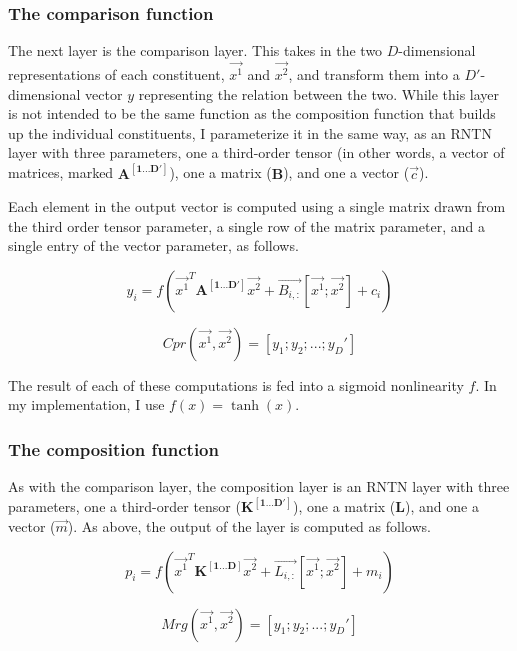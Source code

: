 \documentclass[10pt,letterpaper]{article}
\begin{document}
\subsubsection{The comparison function}

The next layer is the comparison layer. This takes in the two $D$-dimensional representations of each constituent, $\vec{x^1}$ and $\vec{x^2}$, and transform them into a $D'$-dimensional vector $y$ representing the relation between the two. While this layer is not intended to be the same function as the composition function that builds up the individual constituents, I parameterize it in the same way, as an RNTN layer with three parameters, one a third-order tensor (in other words, a vector of matrices, marked $\mathbf{A^{[1...D']}}$), one a matrix  ($\mathbf{B}$), and one a vector ($\vec{c}$).


Each element in the output vector is computed using a single matrix drawn from the third order tensor parameter, a single row of the matrix parameter, and a single entry of the vector parameter, as follows.

\begin{equation}
y_i = f(\vec{x^1}^T \mathbf{A^{[1...D']}} \vec{x^2} + \vec{B_{i,:}} [\vec{x^1}; \vec{x^2}] + c_i)
\end{equation}

\begin{equation}
Cpr(\vec{x^1}, \vec{x^2}) = [y_1; y_2; ...; y_D']
\end{equation}

The result of each of these computations is fed into a sigmoid nonlinearity $f$. In my implementation, I use $f(x) = \tanh(x)$.


\subsubsection{The composition function}


As with the comparison layer, the composition layer is an RNTN layer with three parameters, one a third-order tensor ($\mathbf{K^{[1...D']}}$), one a matrix  ($\mathbf{L}$), and one a vector ($\vec{m}$). As above, the output of the layer is computed as follows.

\begin{equation}
p_i = f(\vec{x^1}^T \mathbf{K^{[1...D]}} \vec{x^2} + \vec{L_{i,:}} [\vec{x^1}; \vec{x^2}] + m_i)
\end{equation}

\begin{equation}
Mrg(\vec{x^1}, \vec{x^2}) = [y_1; y_2; ...; y_D']
\end{equation}
\end{document}
